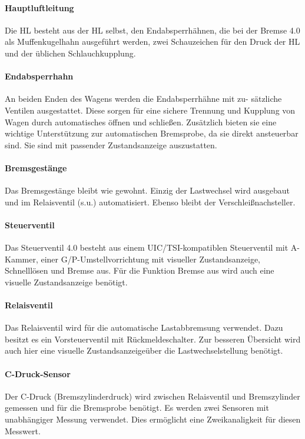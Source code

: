 \paragraph{Hauptluftleitung} Die HL besteht aus der HL selbst, den Endabsperrhähnen, die bei der Bremse 4.0 als Muffenkugelhahn ausgeführt werden, zwei Schauzeichen für den Druck der HL und der üblichen Schlauchkupplung.

\paragraph{Endabsperrhahn} \label{sec:Endabsperrhahn}
An beiden Enden des Wagens werden die Endabsperrhähne mit zu- sätzliche Ventilen ausgestattet. Diese sorgen für eine sichere Trennung und Kupplung von Wagen durch automatisches öffnen und schließen. Zusätzlich bieten sie eine wichtige Unterstützung zur automatischen Bremsprobe, da sie direkt ansteuerbar sind. Sie sind mit passender Zustandsanzeige auszustatten.

\paragraph{Bremsgestänge} Das Bremsgestänge bleibt wie gewohnt. Einzig der Lastwechsel wird ausgebaut und im Relaisventil (s.u.) automatisiert. Ebenso bleibt der Verschleißnachsteller.

\paragraph{Steuerventil}\label{sec:Bremsart}
Das Steuerventil 4.0 besteht aus einem UIC/TSI-kompatiblen Steuerventil mit A-Kammer, einer G/P-Umstellvorrichtung mit visueller Zustandsanzeige, Schnelllösen und Bremse aus. Für die Funktion Bremse aus wird auch eine visuelle Zustandsanzeige benötigt.

\paragraph{Relaisventil} Das Relaisventil wird für die automatische Lastabbremsung verwendet. Dazu besitzt es ein Vorsteuerventil mit Rückmeldeschalter. Zur besseren Übersicht wird auch hier eine visuelle Zustandsanzeigeüber die Lastwechselstellung benötigt.

\paragraph{C-Druck-Sensor} Der C-Druck (Bremszylinderdruck) wird zwischen Relaisventil und Bremszylinder gemessen und für die Bremsprobe benötigt. Es werden zwei Sensoren mit unabhängiger Messung verwendet. Dies ermöglicht eine Zweikanaligkeit für diesen Messwert.

